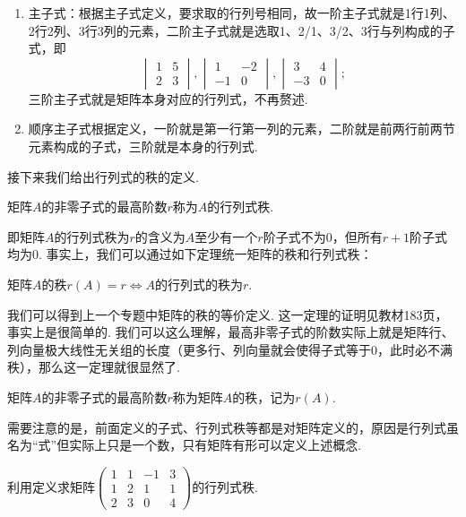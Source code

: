 \begin{solution}
\begin{enumerate}
        \item 主子式：根据主子式定义，要求取的行列号相同，故一阶主子式就是1行1列、2行2列、3行3列的元素，二阶主子式就是选取1、2/1、3/2、3行与列构成的子式，即
              \[\begin{vmatrix}
                      1 & 5 \\ 2 & 3
                  \end{vmatrix},\begin{vmatrix}
                      1 & -2 \\ -1 & 0
                  \end{vmatrix},\begin{vmatrix}
                      3 & 4 \\ -3 & 0
                  \end{vmatrix};\]
              三阶主子式就是矩阵本身对应的行列式，不再赘述.

        \item 顺序主子式根据定义，一阶就是第一行第一列的元素，二阶就是前两行前两节元素构成的子式，三阶就是本身的行列式.
    \end{enumerate}
\end{solution}

接下来我们给出行列式的秩的定义.
\begin{definition}
    矩阵$A$的非零子式的最高阶数$r$称为$A$的行列式秩.
\end{definition}
即矩阵$A$的行列式秩为$r$的含义为$A$至少有一个$r$阶子式不为0，但所有$r+1$阶子式均为0. 事实上，我们可以通过如下定理统一矩阵的秩和行列式秩：
\begin{theorem}\label{thm:13:行列式秩等于行列式秩}
    矩阵$A$的秩$r(A)=r \iff A$的行列式的秩为$r$.
\end{theorem}
我们可以得到上一个专题中矩阵的秩的等价定义. 这一定理的证明见教材183页，事实上是很简单的. 我们可以这么理解，最高非零子式的阶数实际上就是矩阵行、列向量极大线性无关组的长度（更多行、列向量就会使得子式等于0，此时必不满秩），那么这一定理就很显然了.

\begin{definition}
    矩阵$A$的非零子式的最高阶数$r$称为矩阵$A$的秩，记为$r(A)$.
\end{definition}

需要注意的是，前面定义的子式、行列式秩等都是对矩阵定义的，原因是行列式虽名为``式''但实际上只是一个数，只有矩阵有形可以定义上述概念.
\begin{example}
    利用定义求矩阵$\begin{pmatrix}
            1 & 1 & -1 & 3 \\ 1 & 2 & 1 & 1 \\ 2 & 3 & 0 & 4
        \end{pmatrix}$的行列式秩.
\end{example}

